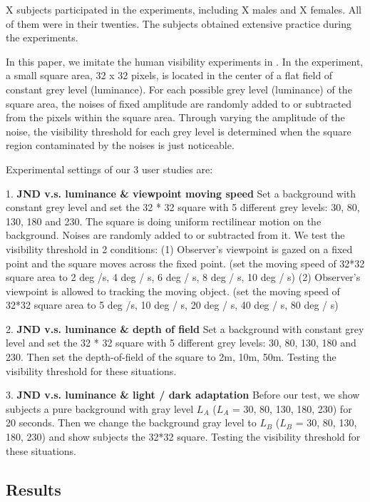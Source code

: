 X subjects participated in the experiments, including X males and X females. All of them were in their twenties. The subjects obtained extensive practice during the experiments.

In this paper, we imitate the human visibility experiments in \cite{PSPNR}. In the experiment, a small square area, 32 x 32 pixels, is located in the center of a flat field of constant grey level (luminance). For each possible grey level (luminance) of the square area, the noises of fixed amplitude are randomly added to or subtracted from the pixels within the square area. Through varying the amplitude of the noise, the visibility threshold for each grey level is determined when the square region contaminated by the noises is just noticeable. 

Experimental settings of our 3 user studies are:

1. \textbf{JND v.s. luminance \& viewpoint moving speed} Set a background with constant grey level and set the 32 * 32 square with 5 different grey levels: 30, 80, 130, 180 and 230. The square is doing uniform rectilinear motion on the background. Noises are randomly added to or subtracted from it. We test the visibility threshold in 2 conditions: (1) Observer's viewpoint is gazed on a fixed point and the square moves across the fixed point. (set the moving speed of 32*32 square area to 2 deg /s, 4 deg / s, 6 deg / s, 8 deg / s, 10 deg / s) (2) Observer's viewpoint is allowed to tracking the moving object. (set the moving speed of 32*32 square area to 5 deg /s, 10 deg / s, 20 deg / s, 40 deg / s, 80 deg / s)

2. \textbf{JND v.s. luminance \& depth of field} Set a background with constant grey level and set the 32 * 32 square with 5 different grey levels: 30, 80, 130, 180 and 230. Then set the depth-of-field of the square to 2m, 10m, 50m. Testing the visibility threshold for these situations.

3. \textbf{JND v.s. luminance \& light / dark adaptation} Before our test, we show subjects a pure background with gray level $L_A$ ($L_A$ = 30, 80, 130, 180, 230) for 20 seconds. Then we change the background gray level to $L_B$ ($L_B$ = 30, 80, 130, 180, 230) and show subjects the 32*32 square. Testing the visibility threshold for these situations.

\subsection{Results}

